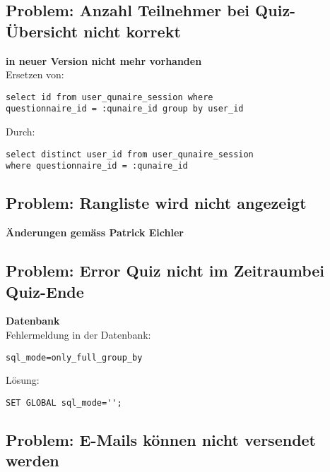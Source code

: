 \subsection{Problem: Anzahl Teilnehmer bei Quiz-Übersicht nicht korrekt}

\textbf{in neuer Version nicht mehr vorhanden} \\

\noindent Ersetzen von:
\begin{lstlisting}[backgroundcolor = \color{lightgray}]
select id from user_qunaire_session where 
questionnaire_id = :qunaire_id group by user_id
\end{lstlisting}

\bigskip
\noindent Durch:
\begin{lstlisting}[backgroundcolor = \color{lightgray}]
select distinct user_id from user_qunaire_session 
where questionnaire_id = :qunaire_id
\end{lstlisting}



\subsection{Problem: Rangliste wird nicht angezeigt}

\textbf{Änderungen gemäss Patrick Eichler}




\subsection{Problem: Error \glqq Quiz nicht im Zeitraum\grqq bei Quiz-Ende}

\textbf{Datenbank} \\

\noindent Fehlermeldung in der Datenbank:
\begin{lstlisting}[backgroundcolor = \color{lightgray}]
sql_mode=only_full_group_by
\end{lstlisting}

\bigskip
\noindent Lösung:
\begin{lstlisting}[backgroundcolor = \color{lightgray}]
SET GLOBAL sql_mode=''; 
\end{lstlisting}



\subsection{Problem: E-Mails können nicht versendet werden}

